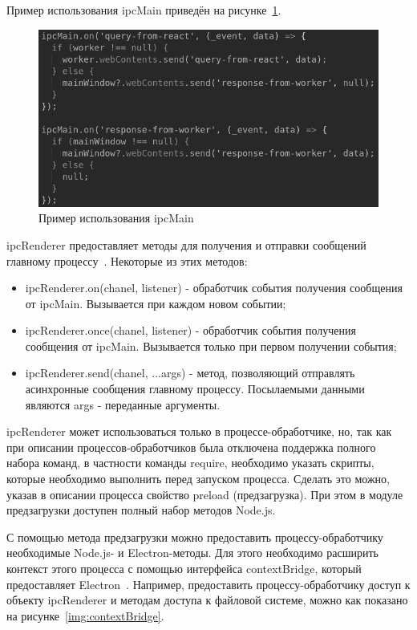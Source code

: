 Пример использования ipcMain приведён на рисунке~\ref{img:ipcMain}.

\begin{figure}[H]
  \centering
  \includegraphics[height=0.2\textheight]{assets/images/practical/ipcMain.png}
  \caption{Пример использования ipcMain}
  \label{img:ipcMain}
\end{figure}

ipcRenderer предоставляет методы для получения и отправки сообщений главному процессу~\cite{electronDocumentation}. Некоторые из этих методов:

\begin{itemize}
  \item ipcRenderer.on(chanel, listener) - обработчик события получения сообщения от ipcMain. Вызывается при каждом новом событии;
  \item ipcRenderer.once(chanel, listener) - обработчик события получения сообщения от ipcMain. Вызывается только при первом получении события;
  \item ipcRenderer.send(chanel, ...args) - метод, позволяющий отправлять асинхронные сообщения главному процессу. Посылаемыми данными являются args - переданные аргументы.
\end{itemize}



ipcRenderer может использоваться только в процессе-обработчике, но, так как при описании процессов-обработчиков была отключена поддержка полного набора команд, в частности команды require, необходимо указать скрипты, которые необходимо выполнить перед запуском процесса. Сделать это можно, указав в описании процесса свойство preload (предзагрузка). При этом в модуле предзагрузки доступен полный набор методов Node.js.

С помощью метода предзагрузки можно предоставить процессу-обработчику необходимые Node.js- и Electron-методы. Для этого необходимо расширить контекст этого процесса с помощью интерфейса contextBridge, который предоставляет Electron~\cite{electronDocumentation}. Например, предоставить процессу-обработчику доступ к объекту ipcRenderer и методам доступа к файловой системе, можно как показано на рисунке~\ref{img:contextBridge}.

